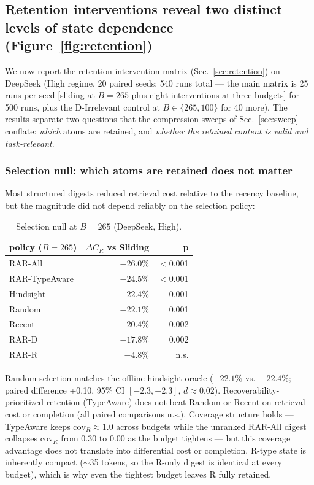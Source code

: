 \documentclass[11pt]{article}
\begin{document}
\subsection{Retention interventions reveal two distinct levels of state dependence (Figure~\ref{fig:retention})}
\label{sec:retention-results}

We now report the retention-intervention matrix (Sec.~\ref{sec:retention}) on DeepSeek (High regime,
20 paired seeds; 540 runs total --- the main matrix is 25 runs per seed [sliding at $B=265$
plus eight interventions at three budgets] for 500 runs, plus the D-Irrelevant control at
$B\in\{265,100\}$ for 40 more). The results separate two
questions that the compression sweeps of Sec.~\ref{sec:sweep} conflate: \emph{which} atoms are retained, and
\emph{whether the retained content is valid and task-relevant}.

\subsubsection{Selection null: which atoms are retained does not matter}
\label{sec:selection}

Most structured digests reduced retrieval cost relative to the recency baseline, but the
magnitude did not depend reliably on the selection policy:

\begin{table}[t]
\centering
\small
\caption{Selection null at $B=265$ (DeepSeek, High).}
\label{tab:selection}
\begin{tabular}{@{}lrr@{}}
\toprule
policy ($B=265$) & $\Delta C_R$ vs Sliding & p \\
\midrule
RAR-All & $-26.0\%$ & $<$0.001 \\
RAR-TypeAware & $-24.5\%$ & $<$0.001 \\
Hindsight & $-22.4\%$ & 0.001 \\
Random & $-22.1\%$ & 0.001 \\
Recent & $-20.4\%$ & 0.002 \\
RAR-D & $-17.8\%$ & 0.002 \\
RAR-R & $-4.8\%$ & n.s. \\
\bottomrule
\end{tabular}
\end{table}

Random selection matches the offline hindsight oracle ($-22.1\%$ vs.\ $-22.4\%$; paired
difference +0.10, 95\% CI $[-2.3, +2.3]$, $d \approx 0.02$). Recoverability-prioritized
retention (TypeAware) does not beat Random or Recent on retrieval cost or completion
(all paired comparisons n.s.). Coverage structure holds --- TypeAware keeps
$\mathrm{cov}_R \approx 1.0$ across budgets while the unranked RAR-All digest collapses
$\mathrm{cov}_R$ from 0.30 to 0.00 as the budget tightens --- but this coverage advantage
does not translate into differential cost or completion. R-type state is inherently
compact ($\sim$35 tokens, so the R-only digest is identical at every budget), which is why
even the tightest budget leaves R fully retained.
\end{document}
